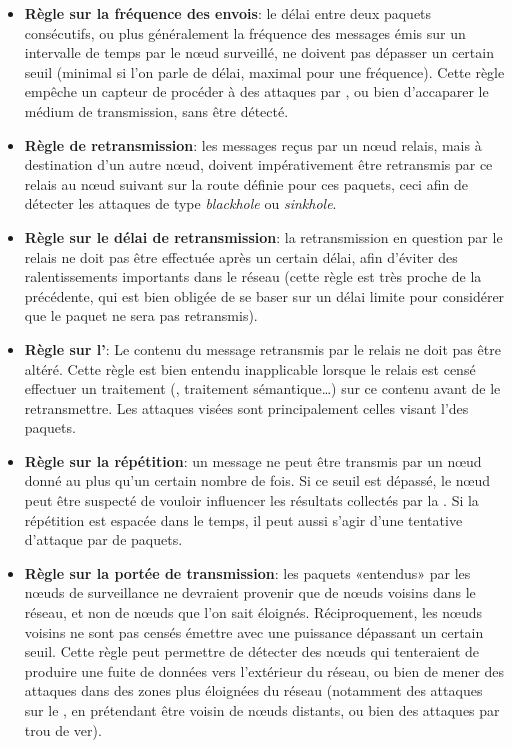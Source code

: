 \begin{itemize}
    \item \textbf{Règle sur la fréquence des envois}: le délai entre deux paquets consécutifs, ou plus généralement la fréquence des messages émis sur un intervalle de temps par le nœud surveillé, ne doivent pas dépasser un certain seuil (minimal si l'on parle de délai, maximal pour une fréquence). Cette règle empêche un capteur de procéder à des attaques par \deluge, ou bien d'accaparer le médium de transmission, sans être détecté.
    \item \textbf{Règle de retransmission}: les messages reçus par un nœud relais, mais à destination d'un autre nœud, doivent impérativement être retransmis par ce relais au nœud suivant sur la route définie pour ces paquets, ceci afin de détecter les attaques de type \textit{blackhole} ou \textit{sinkhole}.
    \item \textbf{Règle sur le délai de retransmission}: la retransmission en question par le relais ne doit pas être effectuée après un certain délai, afin d'éviter des ralentissements importants dans le réseau (cette règle est très proche de la précédente, qui est bien obligée de se baser sur un délai limite pour considérer que le paquet ne sera pas retransmis).
    \item \textbf{Règle sur l'\integrite}: Le contenu du message retransmis par le relais ne doit pas être altéré. Cette règle est bien entendu inapplicable lorsque le relais est censé effectuer un traitement (, traitement sémantique\dots) sur ce contenu avant de le retransmettre. Les attaques visées sont principalement celles visant l'\integrite des paquets.
    \item \textbf{Règle sur la répétition}: un message ne peut être transmis par un nœud donné au plus qu'un certain nombre de fois. Si ce seuil est dépassé, le nœud peut être suspecté de vouloir influencer les résultats collectés par la \sdb. Si la répétition est espacée dans le temps, il peut aussi s'agir d'une tentative d'attaque par  de paquets.
    \item \textbf{Règle sur la portée de transmission}: les paquets «entendus» par les nœuds de surveillance ne devraient provenir que de nœuds voisins dans le réseau, et non de nœuds que l'on sait éloignés. Réciproquement, les nœuds voisins ne sont pas censés émettre avec une puissance dépassant un certain seuil. Cette règle peut permettre de détecter des nœuds qui tenteraient de produire une fuite de données vers l'extérieur du réseau, ou bien de mener des attaques dans des zones plus éloignées du réseau (notamment des attaques sur le , en prétendant être voisin de nœuds distants, ou bien des attaques par trou de ver).

\end{itemize}
